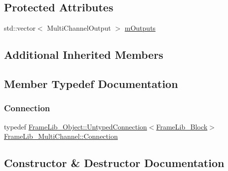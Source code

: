 \subsection*{Protected Attributes}
\begin{DoxyCompactItemize}
\item 
std\+::vector$<$ Multi\+Channel\+Output $>$ \hyperlink{class_frame_lib___multi_channel_a2d993bc32c4625a1adbd84997c5d74f2}{m\+Outputs}
\end{DoxyCompactItemize}
\subsection*{Additional Inherited Members}


\subsection{Member Typedef Documentation}
\mbox{\label{class_frame_lib___multi_channel_ae58a3f32378b88e31fd9da76206c7313}} 
\subsubsection{\texorpdfstring{Connection}{Connection}}
{\footnotesize\ttfamily typedef \hyperlink{struct_frame_lib___object_1_1_untyped_connection}{Frame\+Lib\+\_\+\+Object\+::\+Untyped\+Connection}$<$\hyperlink{class_frame_lib___block}{Frame\+Lib\+\_\+\+Block}$>$ \hyperlink{class_frame_lib___multi_channel_ae58a3f32378b88e31fd9da76206c7313}{Frame\+Lib\+\_\+\+Multi\+Channel\+::\+Connection}\hspace{0.3cm}{\ttfamily [protected]}}



\subsection{Constructor \& Destructor Documentation}
\mbox{\label{class_frame_lib___multi_channel_aa16395513324c73e7be8d1d8a5db87e7}} 
